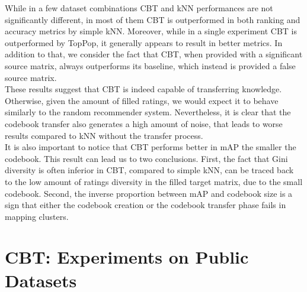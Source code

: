 While in a few dataset combinations CBT and kNN performances are not significantly different, in most of them CBT is outperformed in both ranking and accuracy metrics by simple kNN. Moreover, while in a single experiment CBT is outperformed by TopPop, it generally appears to result in better metrics. In addition to that, we consider the fact that CBT, when provided with a significant source matrix, always outperforms its baseline, which instead is provided a false source matrix.\\
These results suggest that CBT is indeed capable of transferring knowledge. Otherwise, given the amount of filled ratings, we would expect it to behave similarly to the random recommender system. Nevertheless, it is clear that the codebook transfer also generates a high amount of noise, that leads to worse results compared to kNN without the transfer process.\\
It is also important to notice that CBT performs better in mAP the smaller the codebook. This result can lead us to two conclusions. First, the fact that Gini diversity is often inferior in CBT, compared to simple kNN, can be traced back to the low amount of ratings diversity in the filled target matrix, due to the small codebook. Second, the inverse proportion between mAP and codebook size is a sign that either the codebook creation or the codebook transfer phase fails in mapping clusters.

\clearpage



\section{CBT: Experiments on Public Datasets}

